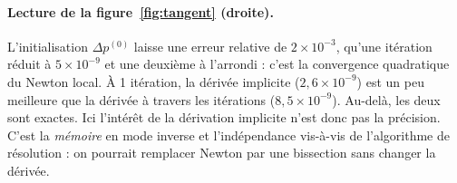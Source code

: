 \paragraph{Lecture de la figure~\ref{fig:tangent} (droite).} L'initialisation $\Delta p^{(0)}$ laisse une erreur relative de $2\times10^{-3}$, qu'une itération réduit à $5\times10^{-9}$ et une deuxième à l'arrondi : c'est la convergence quadratique du Newton local. À 1 itération, la dérivée implicite ($2{,}6\times10^{-9}$) est un peu meilleure que la dérivée à travers les itérations ($8{,}5\times10^{-9}$). Au-delà, les deux sont exactes. Ici l'intérêt de la dérivation implicite n'est donc pas la précision. C'est la \emph{mémoire} en mode inverse et l'indépendance vis-à-vis de l'algorithme de résolution : on pourrait remplacer Newton par une bissection sans changer la dérivée.
